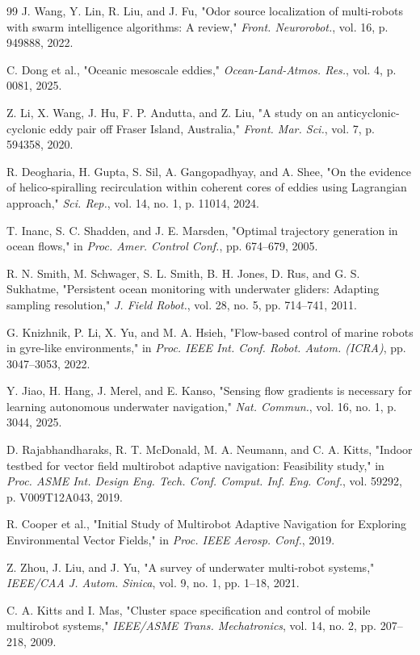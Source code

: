 \documentclass[lettersize,journal]{IEEEtran}
\begin{document}
\begin{thebibliography}{99}
 J. Wang, Y. Lin, R. Liu, and J. Fu, "Odor source localization of multi-robots with swarm intelligence algorithms: A review," \textit{Front. Neurorobot.}, vol. 16, p. 949888, 2022.

 C. Dong et al., "Oceanic mesoscale eddies," \textit{Ocean-Land-Atmos. Res.}, vol. 4, p. 0081, 2025.

 Z. Li, X. Wang, J. Hu, F. P. Andutta, and Z. Liu, "A study on an anticyclonic-cyclonic eddy pair off Fraser Island, Australia," \textit{Front. Mar. Sci.}, vol. 7, p. 594358, 2020.

 R. Deogharia, H. Gupta, S. Sil, A. Gangopadhyay, and A. Shee, "On the evidence of helico-spiralling recirculation within coherent cores of eddies using Lagrangian approach," \textit{Sci. Rep.}, vol. 14, no. 1, p. 11014, 2024.

 T. Inanc, S. C. Shadden, and J. E. Marsden, "Optimal trajectory generation in ocean flows," in \textit{Proc. Amer. Control Conf.}, pp. 674--679, 2005.

 R. N. Smith, M. Schwager, S. L. Smith, B. H. Jones, D. Rus, and G. S. Sukhatme, "Persistent ocean monitoring with underwater gliders: Adapting sampling resolution," \textit{J. Field Robot.}, vol. 28, no. 5, pp. 714--741, 2011.

 G. Knizhnik, P. Li, X. Yu, and M. A. Hsieh, "Flow-based control of marine robots in gyre-like environments," in \textit{Proc. IEEE Int. Conf. Robot. Autom. (ICRA)}, pp. 3047--3053, 2022.

 Y. Jiao, H. Hang, J. Merel, and E. Kanso, "Sensing flow gradients is necessary for learning autonomous underwater navigation," \textit{Nat. Commun.}, vol. 16, no. 1, p. 3044, 2025.

 D. Rajabhandharaks, R. T. McDonald, M. A. Neumann, and C. A. Kitts, "Indoor testbed for vector field multirobot adaptive navigation: Feasibility study," in \textit{Proc. ASME Int. Design Eng. Tech. Conf. Comput. Inf. Eng. Conf.}, vol. 59292, p. V009T12A043, 2019.

 R. Cooper et al., "Initial Study of Multirobot Adaptive Navigation for Exploring Environmental Vector Fields," in \textit{Proc. IEEE Aerosp. Conf.}, 2019.

 Z. Zhou, J. Liu, and J. Yu, "A survey of underwater multi-robot systems," \textit{IEEE/CAA J. Autom. Sinica}, vol. 9, no. 1, pp. 1--18, 2021.

 C. A. Kitts and I. Mas, "Cluster space specification and control of mobile multirobot systems," \textit{IEEE/ASME Trans. Mechatronics}, vol. 14, no. 2, pp. 207--218, 2009.


\end{thebibliography}
\end{document}
